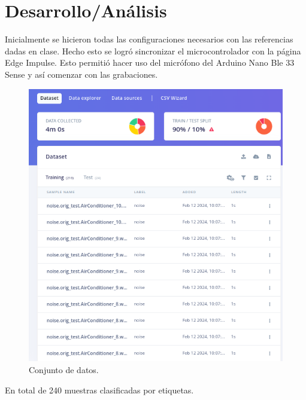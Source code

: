 \section{Desarrollo/Análisis}
Inicialmente se hicieron todas las configuraciones necesarios con las referencias\cite{web5} dadas en clase. Hecho esto se logró sincronizar el microcontrolador con la página Edge Impulse. Esto permitió hacer uso del micrófono del Arduino Nano Ble 33 Sense y así comenzar con las grabaciones.

\begin{figure}[H]
\centering
\includegraphics[width=.55\linewidth]{Img/data_set.png}
 \caption{Conjunto de datos.}
 \label{fig_dataset}
\end{figure}
En total de 240 muestras clasificadas por etiquetas.

